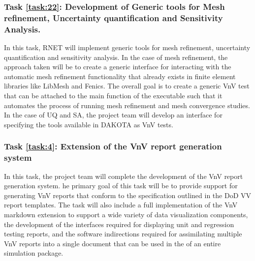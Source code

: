 
\label{task:22}
\subsubsection{Task \ref{task:22}: Development of Generic tools for Mesh refinement, Uncertainty quantification and Sensitivity Analysis.}
In this task, RNET will implement generic \VV tools for mesh refinement, uncertainty quantification and sensitivity analysis. In the case of mesh refinement, the approach taken will be to create a generic interface for interacting with the automatic mesh refinement functionality that already exists in finite element libraries like LibMesh and Fenics. The overall goal is to create a generic VnV test that can be attached to the main function of the executable such that it automates the process of running mesh refinement and mesh convergence studies. In the case of UQ and SA, the project team will develop an interface for specifying the tools available in DAKOTA as VnV tests. 



\label{task:4}
\subsubsection{Task \ref{task:4}: Extension of the VnV report generation system}
In this task, the project team will complete the development of the VnV report generation system. he primary goal of this task will be
to provide support for generating VnV reports that conform to the specification outlined in the DoD VV report templates.  The task will also include  a full implementation 
of the VnV markdown extension to support a wide variety of data visualization components, the development of the interfaces required for displaying unit and regression testing
reports, and the software indirections required for assimilating multiple VnV reports into a single document that can be used in the \VV of an entire simulation package. 


\label{task:1}
